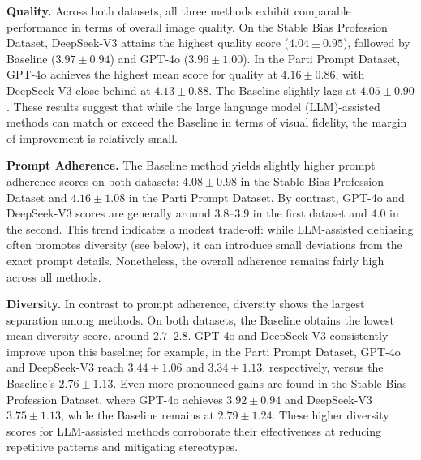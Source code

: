 \noindent \textbf{Quality.}
Across both datasets, all three methods exhibit comparable performance in terms of overall image quality. On the Stable Bias Profession Dataset, DeepSeek-V3 attains the highest quality score ($4.04\pm0.95$), followed by Baseline ($3.97\pm0.94$) and GPT-4o ($3.96\pm1.00$). In the Parti Prompt Dataset, GPT-4o achieves the highest mean score for quality at $4.16\pm0.86$, with DeepSeek-V3 close behind at $4.13\pm0.88$. The Baseline slightly lags at $4.05\pm0.90$. These results suggest that while the large language model (LLM)-assisted methods can match or exceed the Baseline in terms of visual fidelity, the margin of improvement is relatively small. 


\noindent \textbf{Prompt Adherence.}
The Baseline method yields slightly higher prompt adherence scores on both datasets: $4.08\pm0.98$ in the Stable Bias Profession Dataset and $4.16\pm1.08$ in the Parti Prompt Dataset. By contrast, GPT-4o and DeepSeek-V3 scores are generally around $3.8$--$3.9$ in the first dataset and $4.0$ in the second. This trend indicates a modest trade-off: while LLM-assisted debiasing often promotes diversity (see below), it can introduce small deviations from the exact prompt details. Nonetheless, the overall adherence remains fairly high across all methods.


\noindent \textbf{Diversity.}
In contrast to prompt adherence, diversity shows the largest separation among methods. On both datasets, the Baseline obtains the lowest mean diversity score, around $2.7$--$2.8$. GPT-4o and DeepSeek-V3 consistently improve upon this baseline; for example, in the Parti Prompt Dataset, GPT-4o and DeepSeek-V3 reach $3.44\pm1.06$ and $3.34\pm1.13$, respectively, versus the Baseline's $2.76\pm1.13$. Even more pronounced gains are found in the Stable Bias Profession Dataset, where GPT-4o achieves $3.92\pm0.94$ and DeepSeek-V3 $3.75\pm1.13$, while the Baseline remains at $2.79\pm1.24$. These higher diversity scores for LLM-assisted methods corroborate their effectiveness at reducing repetitive patterns and mitigating stereotypes. 


